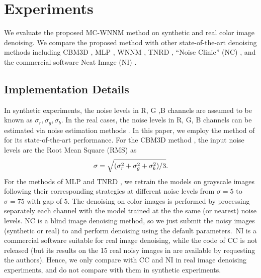 \documentclass[10pt,twocolumn,letterpaper,sort&compress]{article}
\begin{document}
\section{Experiments}
We evaluate the proposed MC-WNNM method on synthetic and real color image denoising. We compare the proposed method with other state-of-the-art denoising methods including CBM3D \cite{cbm3d}, MLP \cite{mlp}, WNNM \cite{wnnm}, TNRD \cite{chen2015learning}, ``Noise Clinic'' (NC) \cite{noiseclinic,ncwebsite}, and the commercial software Neat Image (NI) \cite{neatimage}.

\subsection{Implementation Details}
In synthetic experiments, the noise levels in R, G ,B channels are assumed to be known as $\sigma_{r}, \sigma_{g}, \sigma_{b}$. In the real cases, the noise levels in R, G, B channels can be estimated via noise estimation methods \cite{noiselevel,Chen2015ICCV}. In this paper, we employ the method of \cite{Chen2015ICCV} for its state-of-the-art performance. For the CBM3D method \cite{cbm3d}, the input noise levels are the Root Mean Square (RMS) as 
\vspace{-3mm}
\begin{equation}
\label{e22}
\vspace{-3mm}
\sigma = \sqrt{(\sigma_{r}^{2}+\sigma_{g}^{2}+\sigma_{b}^{2})/3}.
\end{equation}
For the methods of MLP \cite{mlp} and TNRD \cite{chen2015learning}, we retrain the models on grayscale images following their corresponding strategies at different noise levels from $\sigma=5$ to $\sigma=75$ with gap of $5$. The denoising on color images is performed by processing separately each channel with the model trained at the the same (or nearest) noise levels. NC \cite{noiseclinic,ncwebsite} is a blind image denoising method, so we just submit the noisy images (synthetic or real) to \cite{ncwebsite} and perform denoising using the default parameters.\ NI \cite{neatimage} is a commercial software suitable for real image denoising, while the code of CC \cite{crosschannel2016} is not released (but its results on the 15 real noisy images in \cite{crosschannel2016} are available by requesting the authors). Hence, we only compare with CC and NI in real image denoising experiments, and do not compare with them in synthetic experiments. 
\end{document}
